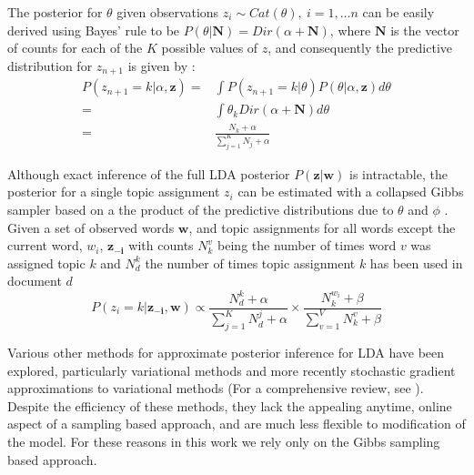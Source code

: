 The posterior for $\theta$ given observations $z_i \sim Cat(\theta),~i = 1, \ldots n$ can be easily derived using Bayes' rule to be $P(\theta | \boldsymbol{N}) = Dir(\alpha + \boldsymbol{N})$, where $\boldsymbol{N}$ is the vector of counts for each of the $K$ possible values of $z$, and consequently the predictive distribution for $z_{n+1}$ is given by \citep{BishopCh2}:
\begin{equation}
\begin{split}
P(z_{n+1}=k | \alpha, \boldsymbol{z}) =& \int P(z_{n+1}=k | \theta) P(\theta | \alpha, \boldsymbol{z}) d\theta\\
=& \int \theta_k Dir(\alpha + \boldsymbol{N}) d\theta\\
=& \frac{N_k + \alpha}{\sum_{j=1}^K N_j + \alpha}
\end{split}
\end{equation}

Although exact inference of the full LDA posterior $P(\boldsymbol{z} | \boldsymbol{w})$ is intractable, the posterior for a single topic assignment $z_i$ can be estimated with a collapsed Gibbs sampler based on a the product of the predictive distributions due to $\theta$ and $\phi$ \citep{griffiths2004}. Given a set of observed words $\textbf{w}$, and topic assignments for all words except the current word, $w_i$, $\boldsymbol{z_{-i}}$ with counts $N^v_k$ being the number of times word $v$ was assigned topic $k$ and $N^k_d$ the number of times topic assignment $k$ has been used in document $d$
\begin{equation} \label{eqn:posterior}
P(z_i = k | \boldsymbol{z_{-i}}, \boldsymbol{w}) \propto \frac{N^k_d + \alpha}{\sum_{j=1}^K N^j_d + \alpha} \times
   \frac{N^{w_i}_k + \beta}{\sum_{v=1}^V N^v_k + \beta}
\end{equation}


Various other methods for approximate posterior inference for LDA have been explored, particularly variational methods and more recently stochastic gradient approximations to variational methods (For a comprehensive review, see \citep{geigle2016}). Despite the efficiency of these methods, they lack the appealing anytime, online aspect of a sampling based approach, and are much less flexible to modification of the model. For these reasons in this work we rely only on the Gibbs sampling based approach.

